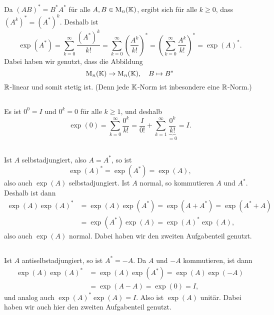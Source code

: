 \documentclass[a4paper, 10pt, numbers=noenddot]{scrartcl}
\begin{document}
\subsection{}
Da $(AB)^* = B^* A^*$ für alle $A, B \in \operatorname{M}_n(\mathbb{K})$, ergibt sich für alle $k \geq 0$, dass $(A^k)^* = (A^*)^k$.
Deshalb ist
\[
    \exp(A^*)
  = \sum_{k=0}^\infty \frac{(A^*)^k}{k!}
  = \sum_{k=0}^\infty \left( \frac{A^k}{k!} \right)^*
  = \left( \sum_{k=0}^\infty \frac{A^k}{k!} \right)^*
  = \exp(A)^*.
\]
Dabei haben wir genutzt, dass die Abbildung
\[
  \operatorname{M}_n(\mathbb{K}) \to \operatorname{M}_n(\mathbb{K}),
  \quad
  B \mapsto B^*
\]
$\mathbb{R}$-linear und somit stetig ist.
(Denn jede $\mathbb{K}$-Norm ist inbesondere eine $\mathbb{R}$-Norm.)



\subsection{}
Es ist $0^0 = I$ und $0^k = 0$ für alle $k \geq 1$, und deshalb
\[
    \exp(0)
  = \sum_{k=0}^\infty \frac{0^k}{k!}
  = \frac{I}{0!} + \sum_{k=1}^\infty \underbrace{ \frac{0^k}{k!} }_{=0}
  = I.
\]





\subsection{}
Ist $A$ selbstadjungiert, also $A = A^*$, so ist
\[
  \exp(A)^* = \exp(A^*) = \exp(A),
\]
also auch $\exp(A)$ selbstadjungiert.
Ist $A$ normal, so kommutieren $A$ und $A^*$.
Deshalb ist dann
\begin{align*}
      \exp(A) \exp(A)^*
  &=  \exp(A) \exp(A^*) 
   =  \exp(A + A^*)
   =  \exp(A^* + A)     \\
  &=  \exp(A^*) \exp(A)
   =  \exp(A)^* \exp(A),
\end{align*}
also auch $\exp(A)$ normal.
Dabei haben wir den zweiten Aufgabenteil genutzt.





\subsection{}
Ist $A$ antiselbstadjungiert, so ist $A^* = -A$.
Da $A$ und $-A$ kommutieren, ist dann
\begin{align*}
      \exp(A) \exp(A)^*
  &=  \exp(A) \exp(A^*)
   =  \exp(A) \exp(-A)  \\
  &=  \exp(A-A)
   =  \exp(0)
   =  I,
\end{align*}
und analog auch $\exp(A)^* \exp(A) = I$.
Also ist $\exp(A)$ unitär.
Dabei haben wir auch hier den zweiten Aufgabenteil genutzt.
\end{document}
